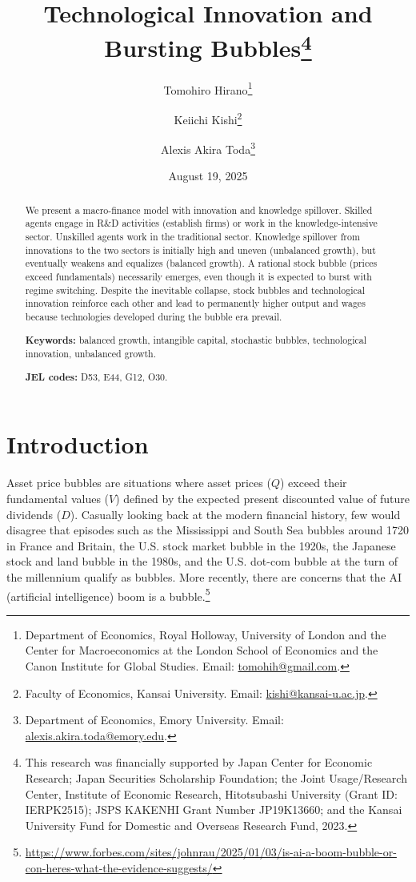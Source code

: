 \documentclass[a4paper,12pt]{article}
\title{Technological Innovation and Bursting Bubbles\thanks{This research was financially supported by Japan Center for Economic Research; Japan Securities Scholarship Foundation; the Joint Usage/Research Center, Institute of Economic Research, Hitotsubashi University (Grant ID: IERPK2515); JSPS KAKENHI Grant Number JP19K13660; and the Kansai University Fund for Domestic and Overseas Research Fund, 2023.}}
\author{Tomohiro Hirano\thanks{Department of Economics, Royal Holloway, University of London and the Center for Macroeconomics at the London School of Economics and the Canon Institute for
 Global Studies. Email: \href{mailto:tomohih@gmail.com}{tomohih@gmail.com}.} \and Keiichi Kishi\thanks{Faculty of Economics, Kansai University. Email: \href{mailto:kishi@kansai-u.ac.jp}{kishi@kansai-u.ac.jp}.} \and Alexis Akira Toda\thanks{Department of Economics, Emory University. Email: \href{mailto:alexis.akira.toda@emory.edu}{alexis.akira.toda@emory.edu}.}}
\date{August 19, 2025}
\numberwithin{equation}{section}
\theoremstyle{plain}
\begin{document}
\maketitle

\begin{abstract}
We present a macro-finance model with innovation and knowledge spillover. Skilled agents engage in R\&D activities (establish firms) or work in the knowledge-intensive sector. Unskilled agents work in the traditional sector. Knowledge spillover from innovations to the two sectors is initially high and uneven (unbalanced growth), but eventually weakens and equalizes (balanced growth). A rational stock bubble (prices exceed fundamentals) necessarily emerges, even though it is expected to burst with regime switching. Despite the inevitable collapse, stock bubbles and technological innovation reinforce each other and lead to permanently higher output and wages because technologies developed during the bubble era prevail.

\medskip

\noindent
\textbf{Keywords:} balanced growth, intangible capital, stochastic bubbles, technological innovation, unbalanced growth.

\medskip

\noindent
\textbf{JEL codes:} D53, E44, G12, O30.
\end{abstract}

\section{Introduction}

Asset price bubbles are situations where asset prices ($Q$) exceed their fundamental values ($V$) defined by the expected present discounted value of future dividends ($D$). Casually looking back at the modern financial history, few would disagree that episodes such as the Mississippi and South Sea bubbles around 1720 in France and Britain, the U.S. stock market bubble in the 1920s, the Japanese stock and land bubble in the 1980s, and the U.S. dot-com bubble at the turn of the millennium qualify as bubbles. More recently, there are concerns that the AI (artificial intelligence) boom is a bubble.\footnote{\url{https://www.forbes.com/sites/johnrau/2025/01/03/is-ai-a-boom-bubble-or-con-heres-what-the-evidence-suggests/}}
\end{document}
